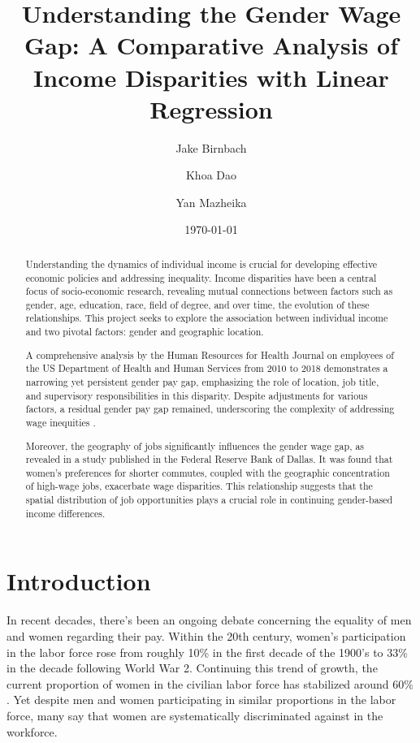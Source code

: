 \documentclass{article}
\title{Understanding the Gender Wage Gap: A Comparative Analysis of Income Disparities with Linear Regression}
\author{Jake Birnbach \and Khoa Dao \and Yan Mazheika}
\date{\today}
\begin{document}
\maketitle
\thispagestyle{empty}
\vspace{\baselineskip}
\vspace{\baselineskip}

\begin{abstract}
    Understanding the dynamics of individual income is crucial for developing effective economic policies and addressing inequality. Income disparities have been a central focus of socio-economic research, revealing mutual connections between factors such as gender, age, education, race, field of degree, and over time, the evolution of these relationships. This project seeks to explore the association between individual income and two pivotal factors: gender and geographic location.

A comprehensive analysis by the Human Resources for Health Journal on employees of the US Department of Health and Human Services from 2010 to 2018 demonstrates a narrowing yet persistent gender pay gap, emphasizing the role of location, job title, and supervisory responsibilities in this disparity. Despite adjustments for various factors, a residual gender pay gap remained, underscoring the complexity of addressing wage inequities \cite{HRfH}.  

Moreover, the geography of jobs significantly influences the gender wage gap, as revealed in a study published in the Federal Reserve Bank of Dallas. It was found that women's preferences for shorter commutes, coupled with the geographic concentration of high-wage jobs, exacerbate wage disparities. This relationship suggests that the spatial distribution of job opportunities plays a crucial role in continuing gender-based income differences. 

\end{abstract}

\section*{Introduction}
In recent decades, there’s been an ongoing debate concerning the equality of men and women regarding their pay. Within the 20th century, women’s participation in the labor force rose from roughly 10\% in the first decade of the 1900’s to 33\% in the decade following World War 2. Continuing this trend of growth, the current proportion of women in the civilian labor force has stabilized around 60\% \cite{BLSarticle}. Yet despite men and women participating in similar proportions in the labor force, many say that women are systematically discriminated against in the workforce.
\\
\end{document}
